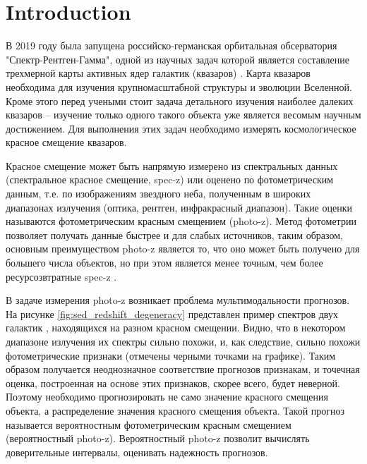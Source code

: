 \section{Introduction}\label{sec:intro}

В 2019 году была запущена российско-германская орбитальная обсерватория "Спектр-Рентген-Гамма", одной из научных задач которой является составление трехмерной карты активных ядер галактик (квазаров) . Карта квазаров необходима для изучения крупномасштабной структуры и эволюции Вселенной. Кроме этого перед учеными стоит задача детального изучения наиболее далеких квазаров -- изучение только одного такого объекта уже является весомым научным достижением. Для выполнения этих задач необходимо измерять космологическое красное смещение квазаров.

Красное смещение может быть напрямую измерено из спектральных данных (спектральное красное смещение, spec-z) или оценено по фотометрическим данным, т.е. по изображениям звездного неба, полученным в широких диапазонах излучения (оптика, рентген, инфракрасный диапазон). Такие оценки называются фотометрическим красным смещением (photo-z). Метод фотометрии позволяет получать данные быстрее и для слабых источников, таким образом, основным преимуществом photo-z является то, что оно может быть получено для большего числа объектов, но при этом является менее точным, чем более ресурсозвтратные spec-z \cite{bib:nature_photoz}.

В задаче измерения photo-z возникает проблема мультимодальности прогнозов. На рисунке \ref{fig:sed_redshift_degeneracy} представлен пример спектров двух галактик , находящихся на разном красном смещении. Видно, что в некотором диапазоне излучения их спектры сильно похожи, и, как следствие, сильно похожи фотометрические признаки (отмечены черными точками на графике). Таким образом получается неоднозначное соответствие прогнозов признакам, и точечная оценка, построенная на основе этих признаков, скорее всего, будет неверной. Поэтому необходимо прогнозировать не само значение красного смещения объекта, а распределение значения красного смещения объекта. Такой прогноз называется вероятностным фотометрическим красным смещением (вероятностный photo-z). Вероятностный photo-z позволит вычислять доверительные интервалы, оценивать надежность прогнозов.


